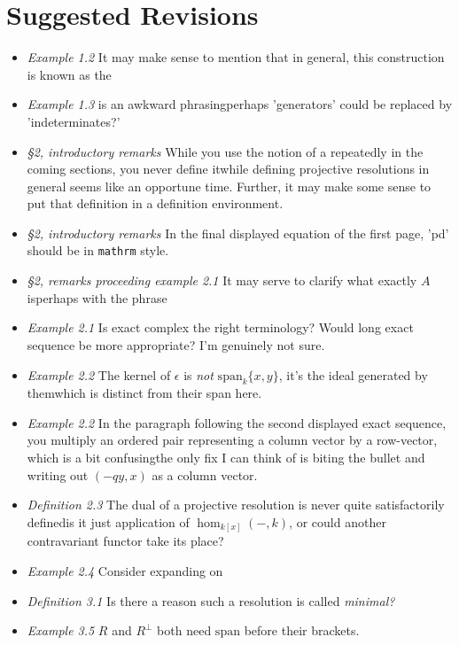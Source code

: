 \documentclass[12pt,letter]{article}
\begin{document}
\section*{Suggested Revisions}
\begin{itemize}
	\item \emph{Example 1.2} It may make sense to mention that in general, this construction is known as the 
	\item \emph{Example 1.3}  is an awkward phrasing\textemdash perhaps 'generators' could be replaced by 'indeterminates?'
	\item \emph{\S2, introductory remarks} While you use the notion of a  repeatedly in the coming sections, you never define it\textemdash while defining projective resolutions in general seems like an opportune time. Further, it may make some sense to put that definition in a definition environment.
	\item \emph{\S2, introductory remarks} In the final displayed equation of the first page, 'pd' should be in \verb|mathrm| style.
	\item \emph{\S2, remarks proceeding example 2.1} It may serve to clarify what exactly $A$ is\textemdash perhaps with the phrase  
	\item \emph{Example 2.1} Is exact complex the right terminology? Would long exact sequence be more appropriate? I'm genuinely not sure.
	\item \emph{Example 2.2}  The kernel of $\epsilon$ is \emph{not} $\mathrm{span}_k\{x,y\}$, it's the ideal generated by them\textemdash which is distinct from their span here. 
	\item \emph{Example 2.2} In the paragraph following the second displayed exact sequence, you multiply an ordered pair representing a column vector by a row-vector, which is a bit confusing\textemdash the only fix I can think of is biting the bullet and writing out $(-qy,x)$ as a column vector. 
	\item \emph{Definition 2.3} The dual of a projective resolution is never quite satisfactorily defined\textemdash is it just application of $\hom_{k[x]}(-,k)$, or could another contravariant functor take its place?
	\item \emph{Example 2.4} Consider expanding on 
	\item \emph{Definition 3.1} Is there a reason such a resolution is called \emph{minimal?}
	\item \emph{Example 3.5} $R$ and $R^\bot$ both need $\mathrm{span}$ before their brackets.  
\end{itemize}
\end{document}
